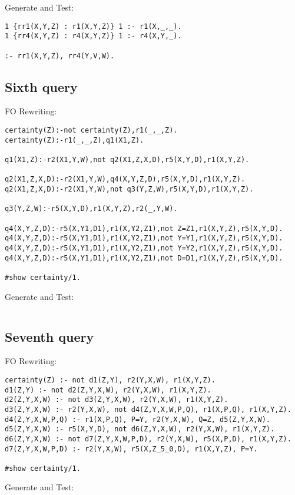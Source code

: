 Generate and Test:
\begin{lstlisting}
1 {rr1(X,Y,Z) : r1(X,Y,Z)} 1 :- r1(X,_,_).
1 {rr4(X,Y,Z) : r4(X,Y,Z)} 1 :- r4(X,Y,_).

:- rr1(X,Y,Z), rr4(Y,V,W).

\end{lstlisting}


\subsection{Sixth query}

FO Rewriting:
\begin{lstlisting}
certainty(Z):-not certainty(Z),r1(_,_,Z).
certainty(Z):-r1(_,_,Z),q1(X1,Z).

q1(X1,Z):-r2(X1,Y,W),not q2(X1,Z,X,D),r5(X,Y,D),r1(X,Y,Z).

q2(X1,Z,X,D):-r2(X1,Y,W),q4(X,Y,Z,D),r5(X,Y,D),r1(X,Y,Z).
q2(X1,Z,X,D):-r2(X1,Y,W),not q3(Y,Z,W),r5(X,Y,D),r1(X,Y,Z).

q3(Y,Z,W):-r5(X,Y,D),r1(X,Y,Z),r2(_,Y,W).

q4(X,Y,Z,D):-r5(X,Y1,D1),r1(X,Y2,Z1),not Z=Z1,r1(X,Y,Z),r5(X,Y,D).
q4(X,Y,Z,D):-r5(X,Y1,D1),r1(X,Y2,Z1),not Y=Y1,r1(X,Y,Z),r5(X,Y,D).
q4(X,Y,Z,D):-r5(X,Y1,D1),r1(X,Y2,Z1),not Y=Y2,r1(X,Y,Z),r5(X,Y,D).
q4(X,Y,Z,D):-r5(X,Y1,D1),r1(X,Y2,Z1),not D=D1,r1(X,Y,Z),r5(X,Y,D).

#show certainty/1.
\end{lstlisting}

Generate and Test:
\begin{lstlisting}
\end{lstlisting}


\subsection{Seventh query}

FO Rewriting:
\begin{lstlisting}
certainty(Z) :- not d1(Z,Y), r2(Y,X,W), r1(X,Y,Z).
d1(Z,Y) :- not d2(Z,Y,X,W), r2(Y,X,W), r1(X,Y,Z).
d2(Z,Y,X,W) :- not d3(Z,Y,X,W), r2(Y,X,W), r1(X,Y,Z).
d3(Z,Y,X,W) :- r2(Y,X,W), not d4(Z,Y,X,W,P,Q), r1(X,P,Q), r1(X,Y,Z).
d4(Z,Y,X,W,P,Q) :- r1(X,P,Q), P=Y, r2(Y,X,W), Q=Z, d5(Z,Y,X,W).
d5(Z,Y,X,W) :- r5(X,Y,D), not d6(Z,Y,X,W), r2(Y,X,W), r1(X,Y,Z).
d6(Z,Y,X,W) :- not d7(Z,Y,X,W,P,D), r2(Y,X,W), r5(X,P,D), r1(X,Y,Z).
d7(Z,Y,X,W,P,D) :- r2(Y,X,W), r5(X,Z_5_0,D), r1(X,Y,Z), P=Y.

#show certainty/1.
\end{lstlisting}

Generate and Test:
\begin{lstlisting}
\end{lstlisting}
